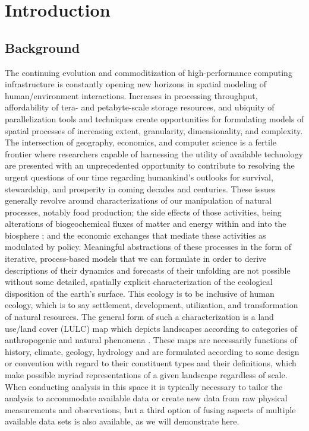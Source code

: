 
\chapter{Introduction}
\label{cha:introduction}

\section{Background}
\label{sec:background}

The continuing evolution and commoditization of high-performance
computing infrastructure is constantly opening new horizons in spatial
modeling of human\slash environment interactions.  Increases in
processing throughput, affordability of tera- and petabyte-scale
storage resources, and ubiquity of parallelization tools and
techniques create opportunities for formulating models of spatial
processes of increasing extent, granularity, dimensionality, and
complexity.  The intersection of geography, economics, and computer
science is a fertile frontier where researchers capable of harnessing
the utility of available technology are presented with an
unprecedented opportunity to contribute to resolving the urgent
questions of our time regarding humankind's outlooks for survival,
stewardship, and prosperity in coming decades and centuries.  These
issues generally revolve around characterizations of our manipulation
of natural processes, notably food production; the side effects of
those activities, being alterations of biogeochemical fluxes of matter
and energy within and into the biosphere \citep{Sellers1997}; and the
economic exchanges that mediate these activities as modulated by
policy.  Meaningful abstractions of these processes in the form of
iterative, process-based models that we can formulate in order to
derive descriptions of their dynamics and forecasts of their unfolding
are not possible without some detailed, spatially explicit
characterization of the ecological disposition of the earth's surface.
This ecology is to be inclusive of human ecology, which is to say
settlement, development, utilization, and transformation of natural
resources.  The general form of such a characterization is a land
use\slash land cover (LULC) map which depicts landscapes according to
categories of anthropogenic and natural phenomena \citep{Fisher2005a}.
 These maps are
necessarily functions of history, climate, geology, hydrology and are
formulated according to some design or convention with regard to their
constituent types and their definitions, which make possible myriad
representations of a given landscape regardless of scale.  When
conducting analysis in this space it is typically necessary to tailor
the analysis to accommodate available data or create new data from raw
physical measurements and observations, but a third option of fusing
aspects of multiple available data sets is also available, as we will
demonstrate here.

